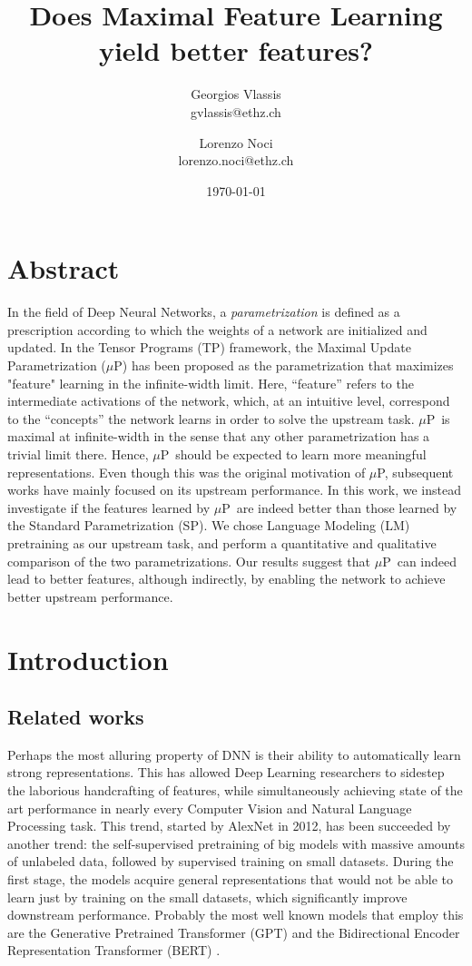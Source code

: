 \documentclass{article}
\title{Does Maximal Feature Learning yield better features?}
\author{
Georgios Vlassis\\
gvlassis@ethz.ch
\and
Lorenzo Noci\\
lorenzo.noci@ethz.ch
}
\date{\today}
\newcommand{\mup}{$\mu$P}
\begin{document}
\maketitle

\section{Abstract}
In the field of Deep Neural Networks, a \textit{parametrization} is defined as a prescription according to which the weights of a network are initialized and updated. In the Tensor Programs (TP) framework, the Maximal Update Parametrization (\mup) has been proposed as the parametrization that maximizes "feature" learning in the infinite-width limit. Here, ``feature'' refers to the intermediate activations of the network, which, at an intuitive level, correspond to the ``concepts'' the network learns in order to solve the upstream task. \mup\ is maximal at infinite-width in the sense that any other parametrization has a trivial limit there. Hence, \mup\ should be expected to learn more meaningful representations. Even though this was the original motivation of \mup, subsequent works have mainly focused on its upstream performance. In this work, we instead investigate if the features learned by \mup\ are indeed better than those learned by the Standard Parametrization (SP). We chose Language Modeling (LM) pretraining as our upstream task, and perform a quantitative and qualitative comparison of the two parametrizations. Our results suggest that \mup\ can indeed lead to better features, although indirectly, by enabling the network to achieve better upstream performance.

\section{Introduction}
\subsection{Related works}
Perhaps the most alluring property of DNN is their ability to automatically learn strong representations. This has allowed Deep Learning researchers to sidestep the laborious handcrafting of features, while simultaneously achieving state of the art performance in nearly every Computer Vision and Natural Language Processing task. This trend, started by AlexNet \cite{alexnet} in 2012, has been succeeded by another trend: the self-supervised pretraining of big models with massive amounts of unlabeled data, followed by supervised training on small datasets. During the first stage, the models acquire general representations that would not be able to learn just by training on the small datasets, which significantly improve downstream performance. Probably the most well known models that employ this are the Generative Pretrained Transformer (GPT) \cite{gpt1,gpt2,gpt3,gpt4} and the Bidirectional Encoder Representation Transformer (BERT) \cite{bert}.
\end{document}
